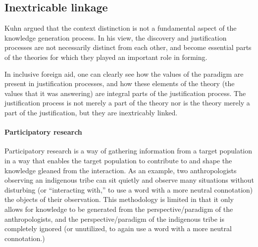 \documentclass[a4paper]{article}
\begin{document}
\subsection{Inextricable linkage}

Kuhn argued that the context distinction is not a fundamental aspect of the
knowledge generation process. In his view, the discovery and justification
processes are not necessarily distinct from each other, and become essential
parts of the theories for which they played an important role in forming.

In inclusive foreign aid, one can clearly see how the values of the paradigm
are present in justification processes, and how these elements of the theory (the
values that it was answering) are integral parts of the justification process.
The justification process is not merely a part of the theory nor is the theory
merely a part of the justification, but they are inextricably linked.

\paragraph{Participatory research}
\label{part}

Participatory research is a way of gathering information from a target
population in a way that enables the target population to contribute to and
shape the knowledge gleaned from the interaction. As an example, two
anthropologists observing an indigenous tribe can sit quietly and observe many
situations without disturbing (or ``interacting with,'' to use a word with a
more neutral connotation) the objects of their observation. This methodology
is limited in that it only allows for knowledge to be generated from the
perspective/paradigm of the anthropologists, and the perspective/paradigm of
the indigenous tribe is completely ignored (or unutilized, to again use a word
with a more neutral connotation.)
\end{document}
